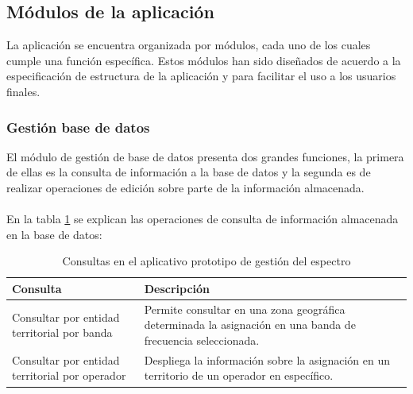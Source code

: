\subsection{Módulos de la aplicación}

La aplicación se encuentra organizada por módulos, cada uno de los cuales cumple una función específica. Estos módulos han sido diseñados de acuerdo a la especificación de estructura de la aplicación y para facilitar el uso a los usuarios finales.

\subsubsection{Gestión base de datos}

El módulo de gestión de base de datos presenta dos grandes funciones, la primera de ellas es la consulta de información a la base de datos y la segunda es de realizar operaciones de edición sobre parte de la información almacenada.
\\\\
En la tabla \ref{tabla:consultaApp} se explican las operaciones de consulta de información almacenada en la base de datos:

\begin{center}
\begin{longtable}{|p{7cm}|p{9cm}|}
	\caption{Consultas en el aplicativo prototipo de gestión del espectro} \label{tabla:consultaApp}\\
	\hline
	\cellcolor[gray]{0.9} \textbf{Consulta} & \cellcolor[gray]{0.9}\textbf{Descripción} \\
	\hline
	Consultar por entidad territorial por banda & Permite consultar en una zona geográfica determinada la asignación en una banda de frecuencia seleccionada.\\
	\hline
	Consultar por entidad territorial por operador & Despliega la información sobre la asignación en un territorio de un operador en específico.\\
	\hline
\end{longtable}	
\end{center}

